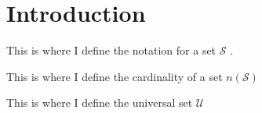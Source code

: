 \documentclass[a4paper]{report}
\begin{document}
\printglossary

\chapter{Introduction}

This is where I define the notation for a set $\mathcal{S}$
.

\clearpage

This is where I define the cardinality of a set $n(\mathcal{S})$

\clearpage

This is where I define the universal set $\mathcal{U}$
\end{document}
